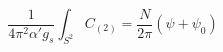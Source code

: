 \begin{equation}
\frac{1}{4\pi^2 \alpha'g_s} \int_{S^2}  C_{(2)} =  \frac{N}{2 \pi}
\left( \psi + \psi_0 \right)
\end{equation}

